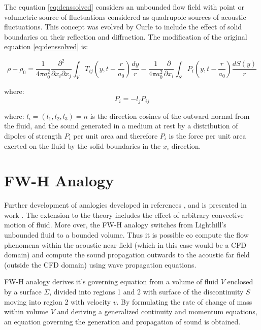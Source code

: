 The equation \ref{eq:denssolved} considers an unbounded flow field with point or volumetric source of fluctuations considered as quadrupole sources of acoustic fluctuations. This concept was evolved by Curle \citep{curle} to include the effect of solid boundaries on their reflection and diffraction. The modification of the original equation \ref{eq:denssolved} is:

\begin{equation} \label{eq:denscurle}
\rho - \rho_0 = \frac{1}{4 \pi a_0^2} \frac{\partial^2}{\partial x_i \partial x_j}
\int_V T_{ij} \left(y, t - \frac{r}{a_0} \right) \frac{dy}{r}
- \frac{1}{4 \pi a_0^2} \frac{\partial}{\partial x_i}
\int_S P_i \left(y, t - \frac{r}{a_0} \right) \frac{dS(y)}{r}
\end{equation}

\noindent where:
\begin{equation} \label{eq:curlePi}
P_i = -l_j P_{ij}
\end{equation}

\noindent where: $l_i = (l_1, l_2, l_3) = n$ is the direction cosines of the outward normal from the fluid, and the sound generated in a medium at rest by a distribution of dipoles of strength $P_i$ per unit area and therefore $P_i$ is the force per unit area exerted on the fluid by the solid boundaries in the $x_i$ direction.



\section{FW-H Analogy}
Further development of analogies developed in references \citep{Light1}, \citep{Light2} and \citep{curle} is presented in work \citep{FWH}. The extension to the theory includes the effect of arbitrary convective motion of fluid. More over, the FW-H analogy switches from Lighthill's unbounded fluid to a bounded volume. Thus it is possible co compute the flow phenomena within the acoustic near field (which in this case would be a CFD domain) and compute the sound propagation outwards to the acoustic far field (outside the CFD domain) using wave propagation equations.

FW-H analogy derives it's governing equation from a volume of fluid $V$ enclosed by a surface $\Sigma$, divided into regions 1 and 2 with surface of the discontinuity $S$ moving into region 2 with velocity $v$. By formulating the rate of change of mass within volume $V$ and deriving a generalized continuity and momentum equations, an equation governing the generation and propagation of sound is obtained.

